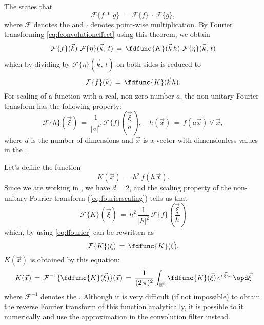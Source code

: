 The  states that
%
\begin{equation} \label{eq:convolutiontheorem}
\mathcal{F}\{f\,*\,g\} \,=\, \mathcal{F}\{f\}\,\cdot\,\mathcal{F}\{g\},
\end{equation}
%
where $\mathcal{F}$ denotes the  and $\cdot$ denotes point-wise multiplication. By Fourier transforming \eqref{eq:fconvolutioneffect} using this theorem, we obtain
%
\begin{equation}
\mathcal{F}\{f\}(\vec{k})\ \mathcal{F}\{\eta\}(\vec{k},\,t) \,=\, \fdfunc{K}(\vec{k}\,h)\ \mathcal{F}\{\eta\}(\vec{k},\,t)
\end{equation}
%
which by dividing by $\mathcal{F}\{\eta\}(\vec{k},\,t)$ on both sides is reduced to
%
\begin{equation} \label{eq:ffourier}
\mathcal{F}\{f\}(\vec{k}) \,=\, \fdfunc{K}(\vec{k}\,h).
\end{equation}
%
For scaling of a function with a real, non-zero number $a$, the non-unitary Fourier transform has the following property:
%
\begin{equation} \label{eq:fourierscaling}
\mathcal{F}\{h\}(\vec{\xi}) \,=\, \frac{1}{|a|^d}\,\mathcal{F}\{f\}\left(\frac{\vec{\xi}}{a}\right)
,\quad
h(\vec{x}) \,=\, f(a\vec{x})\ \forall\ \vec{x},
\end{equation}
%
where $d$ is the number of dimensions and $\vec{x}$ is a vector with dimensionless values in the .

Let's define the function
%
\begin{equation} \label{eq:ftokernel}
K(\vec{x}) \,=\, h^2\,f(h\,\vec{x}).
\end{equation}
%
Since we are working in , we have $d = 2$, and the scaling property of the non-unitary Fourier transform (\eqref{eq:fourierscaling}) tells us that
%
\begin{equation}
\mathcal{F}\{K\}(\vec{\xi}) \,=\, h^2\,\frac{1}{|h|^2}\,\mathcal{F}\{f\}\left(\frac{\vec{\xi}}{h}\right)
\end{equation}
%
which, by using \eqref{eq:ffourier} can be rewritten as
%
\begin{equation}
\mathcal{F}\{K\}(\vec{\xi}) \,=\, \fdfunc{K}(\vec{\xi}).
\end{equation}
%
$K(\vec{x})$ is obtained by  this equation:
%
\begin{equation} \label{eq:kernelfour2d}
K(\vec{x}) \,=\, \mathcal{F}^{-1}\{\fdfunc{K}(\vec{\xi})\}(\vec{x}) \,=\, \frac{1}{(2\,\pi)^2}\int_{\mathbb{R}^2}\fdfunc{K}(\vec{\xi})\,e^{i\,\vec{\xi}\cdot\vec{x}}\,\opd\vec{\xi}
\end{equation}
%
where $\mathcal{F}^{-1}$ denotes the . Although it is very difficult (if not impossible) to obtain the reverse Fourier transform of this function analytically, it is possible to  it numerically and use the approximation in the convolution filter instead.

